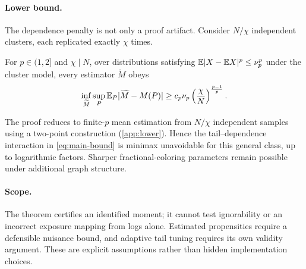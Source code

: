 \paragraph{Lower bound.}
The dependence penalty is not only a proof artifact. Consider $N/\chi$ independent clusters, each replicated exactly $\chi$ times.
\begin{theorem}
\label{thm:lower}
For $p\in(1,2]$ and $\chi\mid N$, over distributions satisfying $\mathbb{E}|X-\mathbb{E} X|^p\le\nu_p^p$ under the cluster model, every estimator $\widetilde M$ obeys
\begin{equation}
\inf_{\widetilde M}\sup_P\mathbb{E}_P|\widetilde M-M(P)|
\ge c_p\nu_p\left(\frac{\chi}{N}\right)^{\frac{p-1}{p}}.
\label{eq:lower-bound}
\end{equation}
\end{theorem}
The proof reduces to finite-$p$ mean estimation from $N/\chi$ independent samples using a two-point construction (\cref{app:lower}). Hence the tail--dependence interaction in \cref{eq:main-bound} is minimax unavoidable for this general class, up to logarithmic factors. Sharper fractional-coloring parameters remain possible under additional graph structure.

\paragraph{Scope.}
The theorem certifies an identified moment; it cannot test ignorability or an incorrect exposure mapping from logs alone. Estimated propensities require a defensible nuisance bound, and adaptive tail tuning requires its own validity argument. These are explicit assumptions rather than hidden implementation choices.
